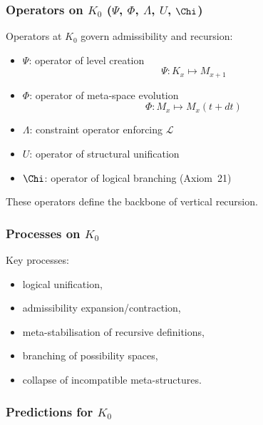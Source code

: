 \subsubsection{Operators on \texorpdfstring{$K_0$}{K_0} (\texorpdfstring{$\Psi$}{\Psi}, \texorpdfstring{$\Phi$}{\Phi}, \texorpdfstring{$\Lambda$}{\Lambda}, \texorpdfstring{$U$}{U}, \texorpdfstring{$\Chi$}{\Chi})}

Operators at $K_0$ govern admissibility and recursion:

\begin{itemize}
    \item $\Psi$: operator of level creation
          \[
          \Psi: K_x \mapsto M_{x+1}
          \]
    \item $\Phi$: operator of meta-space evolution
          \[
          \Phi: M_x \mapsto M_x(t+dt)
          \]
    \item $\Lambda$: constraint operator enforcing $\mathcal{L}$
    \item $U$: operator of structural unification
    \item $\Chi$: operator of logical branching (Axiom~21)
\end{itemize}

These operators define the backbone of vertical recursion.

\subsubsection{Processes on \texorpdfstring{$K_0$}{K_0}}

Key processes:
\begin{itemize}
    \item logical unification,
    \item admissibility expansion/contraction,
    \item meta-stabilisation of recursive definitions,
    \item branching of possibility spaces,
    \item collapse of incompatible meta-structures.
\end{itemize}

\subsubsection{Predictions for \texorpdfstring{$K_0$}{K_0}}

